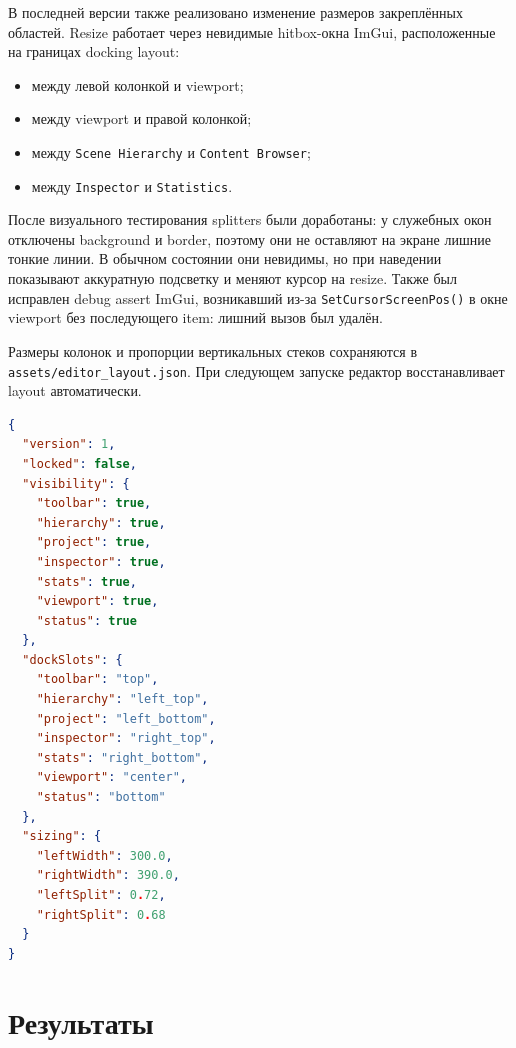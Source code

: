 \documentclass[a4paper,14pt]{extarticle}
\DeclareRobustCommand{\code}[1]{\nolinkurl{#1}}
\begin{document}
В последней версии также реализовано изменение размеров закреплённых областей. Resize работает через невидимые hitbox-окна ImGui, расположенные на границах docking layout:
\begin{itemize}
  \item между левой колонкой и viewport;
  \item между viewport и правой колонкой;
  \item между \texttt{Scene Hierarchy} и \texttt{Content Browser};
  \item между \texttt{Inspector} и \texttt{Statistics}.
\end{itemize}

После визуального тестирования splitters были доработаны: у служебных окон отключены background и border, поэтому они не оставляют на экране лишние тонкие линии. В обычном состоянии они невидимы, но при наведении показывают аккуратную подсветку и меняют курсор на resize. Также был исправлен debug assert ImGui, возникавший из-за \texttt{SetCursorScreenPos()} в окне viewport без последующего item: лишний вызов был удалён.

Размеры колонок и пропорции вертикальных стеков сохраняются в \code{assets/editor_layout.json}. При следующем запуске редактор восстанавливает layout автоматически.

\begin{lstlisting}[language=json,caption={Структура файла сохранения layout}]
{
  "version": 1,
  "locked": false,
  "visibility": {
    "toolbar": true,
    "hierarchy": true,
    "project": true,
    "inspector": true,
    "stats": true,
    "viewport": true,
    "status": true
  },
  "dockSlots": {
    "toolbar": "top",
    "hierarchy": "left_top",
    "project": "left_bottom",
    "inspector": "right_top",
    "stats": "right_bottom",
    "viewport": "center",
    "status": "bottom"
  },
  "sizing": {
    "leftWidth": 300.0,
    "rightWidth": 390.0,
    "leftSplit": 0.72,
    "rightSplit": 0.68
  }
}
\end{lstlisting}

\section{Результаты}
\end{document}

